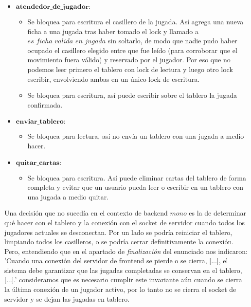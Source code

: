 \begin{itemize}

\item $\mathbf{atendedor\_de\_jugador}:$

\begin{itemize}
\item Se bloquea para escritura el casillero de la jugada. Así agrega una nueva ficha a una jugada tras haber tomado el lock y llamado a $es\_ficha\_valida\_en\_jugada$ sin soltarlo, de modo que nadie pudo haber ocupado el casillero elegido entre que fue leído (para corroborar que el movimiento fuera válido) y reservado por el jugador. Por eso que no podemos leer primero el tablero con lock de lectura y luego otro lock escribir, envolviendo ambas en un único lock de escritura.

\item Se bloquea para escritura, así puede escribir sobre el tablero la jugada confirmada.

\end{itemize}

\item $\mathbf{enviar\_tablero}:$

\begin{itemize}

\item Se bloquea para lectura, así no envía un tablero con una jugada a medio hacer.

\end{itemize}

\item $\mathbf{quitar\_cartas:}$

\begin{itemize}

\item Se bloquea para escritura. Así puede eliminar cartas del tablero de forma completa y evitar que un usuario pueda leer o escribir en un tablero con una jugada a medio quitar.

\end{itemize}

\end{itemize}

Una decisión que no sucedía en el contexto de backend $mono$ es la de determinar qué hacer con el tablero y la conexión con el socket de servidor cuando todos los jugadores actuales se desconectan. Por un lado se podría reiniciar el tablero, limpiando todos los casilleros, o se podría cerrar definitivamente la conexión. Pero, entendiendo que en el apartado de \emph{finalización} del enunciado nos indicaron: 'Cuando una conexión del servidor de frontend se pierde o se cierra, [...], el sistema debe garantizar que las jugadas completadas se conservan en el tablero, [...].' consideramos que es necesario cumplir este invariante aún cuando se cierra la última conexión de un jugador activo, por lo tanto no se cierra el socket de servidor y se dejan las jugadas en tablero.
